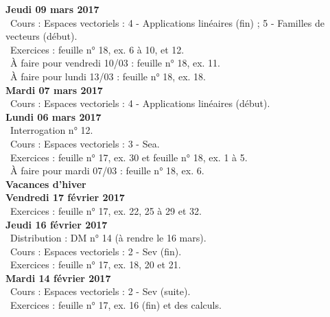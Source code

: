 \documentclass[12pt,a4paper]{article}
\begin{document}
\noindent\textbf{Jeudi 09 mars 2017}\\
\bu\ Cours : Espaces vectoriels : 4 - Applications linéaires (fin) ; 5 - Familles de vecteurs (début).\\
\bu\ Exercices : feuille n° 18, ex. 6 à 10, et 12.\\
\bu\ À faire pour vendredi 10/03 : feuille n° 18, ex. 11.\\
\bu\ À faire pour lundi 13/03 : feuille n° 18, ex. 18.\vspace{.4cm}\\

\noindent\textbf{\bf Mardi 07 mars 2017} \\
\bu\ Cours : Espaces vectoriels : 4 - Applications linéaires (début).\vspace{.4cm}\\

\noindent\textbf{\bf Lundi 06 mars 2017} \\
\bu\ Interrogation n° 12.\\
\bu\ Cours : Espaces vectoriels : 3 - Sea.\\
\bu\ Exercices : feuille n° 17, ex. 30 et feuille n° 18, ex. 1 à 5.\\
\bu\ À faire pour mardi 07/03 : feuille n° 18, ex. 6.\vspace{.4cm}\\

\noindent\textbf{\bf Vacances d'hiver }\\

\noindent\textbf{Vendredi 17 février 2017}\\
\bu\ Exercices : feuille n° 17, ex. 22, 25 à 29 et 32.\vspace{.4cm}\\

\noindent\textbf{Jeudi 16 février 2017}\\
\bu\ Distribution : DM n° 14 (à rendre le 16 mars).\\
\bu\ Cours : Espaces vectoriels : 2 - Sev (fin).\\
\bu\ Exercices : feuille n° 17, ex. 18, 20 et 21.\vspace{.4cm}\\

\noindent\textbf{\bf Mardi 14 février 2017} \\
\bu\ Cours : Espaces vectoriels : 2 - Sev (suite).\\
\bu\ Exercices : feuille n° 17, ex. 16 (fin) et des calculs.\vspace{.4cm}\\
\end{document}
